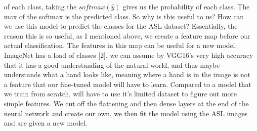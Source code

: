 \documentclass[12pt]{article}
\begin{document}
of each class, taking the $softmax(\hat{y})$ gives us the probability of each class. The max of the softmax is the predicted class. So why is this useful to us? How can we use this model to predict
the classes for the ASL dataset? Essentially, the reason this is so useful, as I mentioned above, we create a feature map before our actual classification. The features in this map can be useful for a new model. ImageNet has a load of classes [2], we can assume by VGG16's very high accuracy that it has a good understanding of the natural world, and thus maybe understands what a hand looks like, meaning 
where a hand is in the image is not a feature that our fine-tuned model will have to learn. Compared to a model that we train from scratch, will have to use it's limited dataset to figure out more simple features. We cut off
the flattening and then dense layers at the end of the neural network and create our own, we then fit the model using the ASL images and are given a new model. \\
\end{document}

